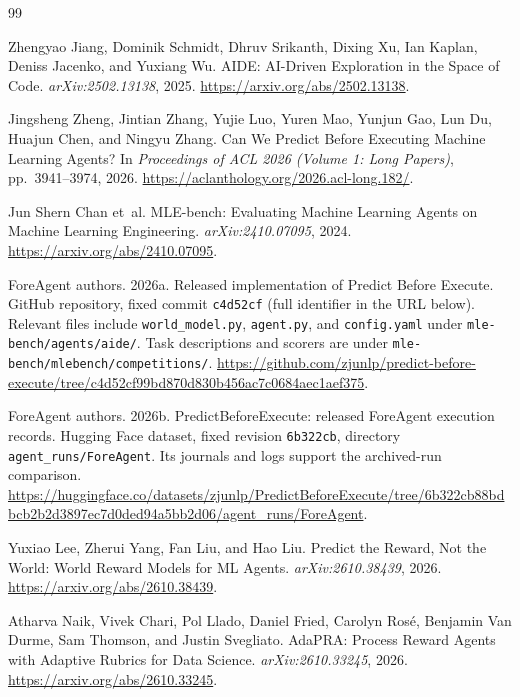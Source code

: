\documentclass{article}
\begin{document}
\begingroup\small
\begin{thebibliography}{99}

Zhengyao Jiang, Dominik Schmidt, Dhruv Srikanth, Dixing Xu, Ian Kaplan, Deniss Jacenko, and Yuxiang Wu.
\newblock AIDE: AI-Driven Exploration in the Space of Code.
\newblock \emph{arXiv:2502.13138}, 2025.
\newblock \url{https://arxiv.org/abs/2502.13138}.

Jingsheng Zheng, Jintian Zhang, Yujie Luo, Yuren Mao, Yunjun Gao, Lun Du, Huajun Chen, and Ningyu Zhang.
\newblock Can We Predict Before Executing Machine Learning Agents?
\newblock In \emph{Proceedings of ACL 2026 (Volume 1: Long Papers)}, pp.\ 3941--3974, 2026.
\newblock \url{https://aclanthology.org/2026.acl-long.182/}.

Jun Shern Chan et~al.
\newblock MLE-bench: Evaluating Machine Learning Agents on Machine Learning Engineering.
\newblock \emph{arXiv:2410.07095}, 2024.
\newblock \url{https://arxiv.org/abs/2410.07095}.

ForeAgent authors. 2026a.
\newblock Released implementation of Predict Before Execute.
\newblock GitHub repository, fixed commit \texttt{c4d52cf} (full identifier in the URL below).
\newblock Relevant files include \texttt{world\_model.py}, \texttt{agent.py}, and \texttt{config.yaml} under \texttt{mle-bench/agents/aide/}.
\newblock Task descriptions and scorers are under \texttt{mle-bench/mlebench/competitions/}.
\newblock \url{https://github.com/zjunlp/predict-before-execute/tree/c4d52cf99bd870d830b456ac7c0684aec1aef375}.

ForeAgent authors. 2026b.
\newblock PredictBeforeExecute: released ForeAgent execution records.
\newblock Hugging Face dataset, fixed revision \texttt{6b322cb}, directory \texttt{agent\_runs/ForeAgent}. Its journals and logs support the archived-run comparison.
\newblock \url{https://huggingface.co/datasets/zjunlp/PredictBeforeExecute/tree/6b322cb88bdbcb2b2d3897ec7d0ded94a5bb2d06/agent_runs/ForeAgent}.


Yuxiao Lee, Zherui Yang, Fan Liu, and Hao Liu.
\newblock Predict the Reward, Not the World: World Reward Models for ML Agents.
\newblock \emph{arXiv:2610.38439}, 2026.
\newblock \url{https://arxiv.org/abs/2610.38439}.

Atharva Naik, Vivek Chari, Pol Llado, Daniel Fried, Carolyn Ros\'{e}, Benjamin Van Durme, Sam Thomson, and Justin Svegliato.
\newblock AdaPRA: Process Reward Agents with Adaptive Rubrics for Data Science.
\newblock \emph{arXiv:2610.33245}, 2026.
\newblock \url{https://arxiv.org/abs/2610.33245}.


\end{thebibliography}
\end{document}
